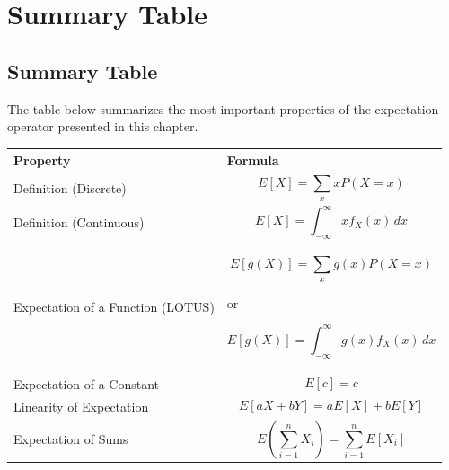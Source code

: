 \documentclass[11pt]{article}
\begin{document}
	\section{Summary Table}
	\begin{mdframed}[
		linewidth=0.8pt,
		roundcorner=6pt,
		backgroundcolor=gray!5,
		linecolor=gray!60,
		innertopmargin=10pt,
		innerbottommargin=10pt,
		innerleftmargin=10pt,
		innerrightmargin=10pt
		]
		
		\subsection*{Summary Table}
		
		The table below summarizes the most important properties of the expectation
		operator presented in this chapter.
		
		\bigskip
		
		\renewcommand{\arraystretch}{1.5}
		
		\begin{center}
			\begin{tabular}{|p{5.2cm}|p{7.8cm}|}
				\hline
				\textbf{Property} &
				\textbf{Formula}
				\\
				\hline
				
				Definition (Discrete)
				&
				\[
				E[X]
				=
				\sum_x xP(X=x)
				\]
				\\
				\hline
				
				Definition (Continuous)
				&
				\[
				E[X]
				=
				\int_{-\infty}^{\infty}
				xf_X(x)\,dx
				\]
				\\
				\hline
				
				Expectation of a Function (LOTUS)
				&
				\[
				E[g(X)]
				=
				\sum_x g(x)P(X=x)
				\]
				
				or
				
				\[
				E[g(X)]
				=
				\int_{-\infty}^{\infty}
				g(x)f_X(x)\,dx
				\]
				\\
				\hline
				
				Expectation of a Constant
				&
				\[
				E[c]=c
				\]
				\\
				\hline
				
				Linearity of Expectation
				&
				\[
				E[aX+bY]
				=
				aE[X]
				+
				bE[Y]
				\]
				\\
				\hline
				
				Expectation of Sums
				&
				\[
				E\!\left(
				\sum_{i=1}^{n}X_i
				\right)
				=
				\sum_{i=1}^{n}E[X_i]
				\]
				\\
				\hline
				

\end{tabular}
\end{center}
\end{mdframed}
\end{document}
